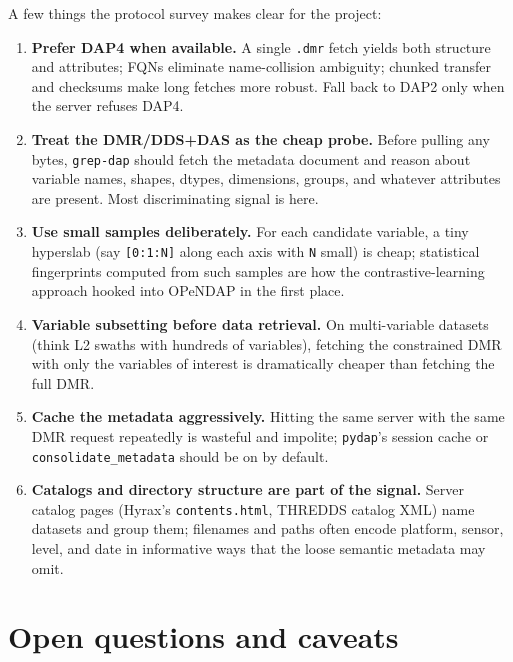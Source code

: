 \documentclass[11pt]{article}
\begin{document}
A few things the protocol survey makes clear for the project:
\begin{enumerate}
  \item \textbf{Prefer DAP4 when available.} A single \texttt{.dmr}
    fetch yields both structure and attributes; FQNs eliminate
    name-collision ambiguity; chunked transfer and checksums make
    long fetches more robust. Fall back to DAP2 only when the server
    refuses DAP4.
  \item \textbf{Treat the DMR/DDS+DAS as the cheap probe.} Before
    pulling any bytes, \texttt{grep-dap} should fetch the metadata
    document and reason about variable names, shapes, dtypes,
    dimensions, groups, and whatever attributes are present. Most
    discriminating signal is here.
  \item \textbf{Use small samples deliberately.} For each candidate
    variable, a tiny hyperslab (say \texttt{[0:1:N]} along each axis
    with \texttt{N} small) is cheap; statistical fingerprints
    computed from such samples are how the contrastive-learning
    approach hooked into OPeNDAP in the first place.
  \item \textbf{Variable subsetting before data retrieval.} On
    multi-variable datasets (think L2 swaths with hundreds of
    variables), fetching the constrained DMR with only the
    variables of interest is dramatically cheaper than fetching the
    full DMR.
  \item \textbf{Cache the metadata aggressively.} Hitting the same
    server with the same DMR request repeatedly is wasteful and
    impolite; \texttt{pydap}'s session cache or
    \texttt{consolidate\_metadata} should be on by default.
  \item \textbf{Catalogs and directory structure are part of the
    signal.} Server catalog pages (Hyrax's \texttt{contents.html},
    THREDDS catalog XML) name datasets and group them; filenames
    and paths often encode platform, sensor, level, and date in
    informative ways that the loose semantic metadata may omit.
\end{enumerate}

\section{Open questions and caveats}
\end{document}
